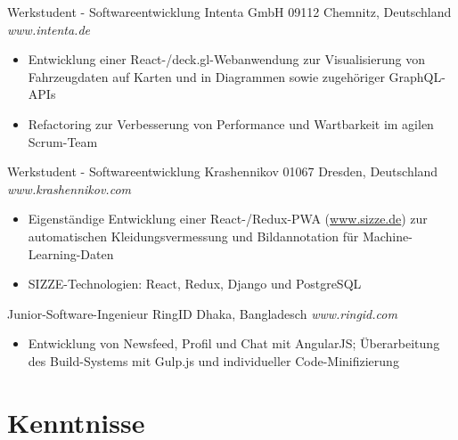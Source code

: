 \documentclass[11pt,a4paper,sans]{moderncv} %
\begin{document}
{Werkstudent - Softwareentwicklung}
{Intenta GmbH}
{09112 Chemnitz, Deutschland}
{\textit{www.intenta.de}}
{\begin{itemize}
    \item Entwicklung einer React-/deck.gl-Webanwendung zur Visualisierung von Fahrzeugdaten auf Karten und in Diagrammen sowie zugehöriger GraphQL-APIs
    \item Refactoring zur Verbesserung von Performance und Wartbarkeit im agilen Scrum-Team
\end{itemize}} 

{Werkstudent - Softwareentwicklung}
{Krashennikov}
{01067 Dresden, Deutschland}
{\textit{www.krashennikov.com}}
{\begin{itemize}
    \item Eigenständige Entwicklung einer React-/Redux-PWA (\underline{www.sizze.de}) zur automatischen Kleidungsvermessung und Bildannotation für Machine-Learning-Daten
    \item SIZZE-Technologien: React, Redux, Django und PostgreSQL
\end{itemize}} 

{Junior-Software-Ingenieur}
{RingID}
{Dhaka, Bangladesch}
{\textit{www.ringid.com}}
{\begin{itemize}
    \item Entwicklung von Newsfeed, Profil und Chat mit AngularJS; Überarbeitung des Build-Systems mit Gulp.js und individueller Code-Minifizierung
\end{itemize}} 


\section{Kenntnisse}

\end{document}
